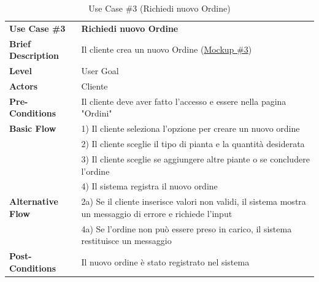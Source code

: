 \documentclass{article}
\begin{document}
\begin{table}[p]
    \begin{tabularx}{\textwidth}{ | l  X | }
        \rowcolor{lightgray!70}
        \hline
        \textbf{Use Case \#3} & \textbf{Richiedi nuovo Ordine} \\[0.5ex]
        \textbf{Brief Description} & Il cliente crea un nuovo Ordine (\hyperref[fig:mockup_3]{Mockup \#3})\\
        \rowcolor{blue!10}
        \textbf{Level} & User Goal \\
        \textbf{Actors} & Cliente \\
        \rowcolor{blue!10}
        \textbf{Pre-Conditions} & Il cliente deve aver fatto l'accesso e essere nella pagina "Ordini" \\
        \textbf{Basic Flow} & 1) Il cliente seleziona l'opzione per creare un nuovo ordine\\
        & 2) Il cliente sceglie il tipo di pianta e la quantità desiderata\\
        & 3) Il cliente sceglie se aggiungere altre piante o se concludere l'ordine\\
        & 4) Il sistema registra il nuovo ordine\\
        \rowcolor{blue!10}
        \textbf{Alternative Flow} & 2a) Se il cliente inserisce valori non validi, il sistema mostra un messaggio di errore e richiede l'input\\
        \rowcolor{blue!10}
        & 4a) Se l'ordine non può essere preso in carico, il sistema restituisce un messaggio\\
        \textbf{Post-Conditions} & Il nuovo ordine è stato registrato nel sistema \\
        \hline
    \end{tabularx}
    \caption{Use Case \#3 (Richiedi nuovo Ordine)}
\end{table}
\end{document}
